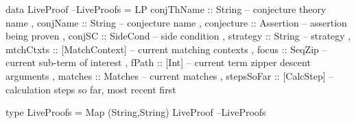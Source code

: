 \begin{code}
data LiveProof                                                    --LiveProofs
  = LP {
      conjThName :: String -- conjecture theory name
    , conjName :: String -- conjecture name
    , conjecture :: Assertion -- assertion being proven
    , conjSC :: SideCond -- side condition
    , strategy :: String -- strategy
    , mtchCtxts :: [MatchContext] -- current matching contexts
    , focus :: SeqZip  -- current sub-term of interest
    , fPath :: [Int] -- current term zipper descent arguments
    , matches :: Matches -- current matches
    , stepsSoFar :: [CalcStep]  -- calculation steps so far, most recent first
    }
\end{code}

\begin{code}
type LiveProofs = Map (String,String) LiveProof                   --LiveProofs
\end{code}
